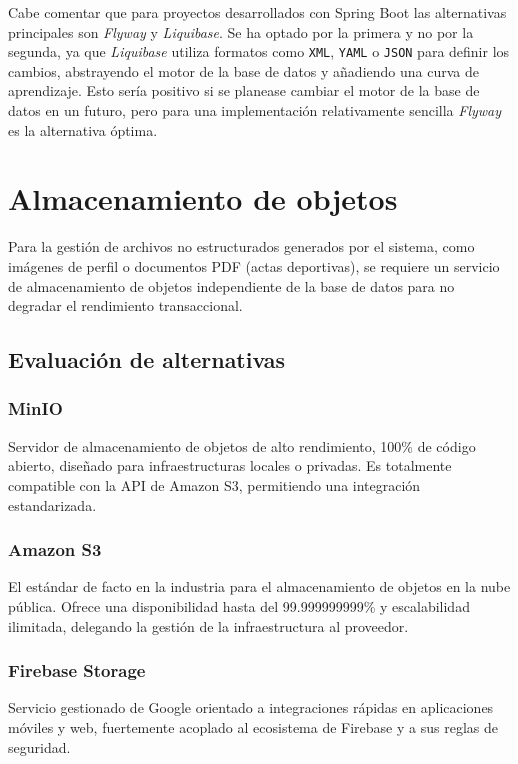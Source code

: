 Cabe comentar que para proyectos desarrollados con Spring Boot las alternativas principales son \emph{Flyway} y \emph{Liquibase}. Se ha optado por la primera y no por la segunda, ya que \emph{Liquibase} utiliza formatos como \texttt{XML}, \texttt{YAML} o \texttt{JSON} para definir los cambios, abstrayendo el motor de la base de datos y añadiendo una curva de aprendizaje. Esto sería positivo si se planease cambiar el motor de la base de datos en un futuro, pero para una implementación relativamente sencilla \emph{Flyway} es la alternativa óptima.

\section{Almacenamiento de objetos}

Para la gestión de archivos no estructurados generados por el sistema, como imágenes de perfil o documentos PDF (actas deportivas), se requiere un servicio de almacenamiento de objetos independiente de la base de datos para no degradar el rendimiento transaccional.

\subsection*{Evaluación de alternativas}

\subsubsection*{MinIO}
Servidor de almacenamiento de objetos de alto rendimiento, 100\% de código abierto, diseñado para infraestructuras locales o privadas. Es totalmente compatible con la API de Amazon S3, permitiendo una integración estandarizada.

\subsubsection*{Amazon S3}
El estándar de facto en la industria para el almacenamiento de objetos en la nube pública. Ofrece una disponibilidad hasta del 99.999999999\% y escalabilidad ilimitada, delegando la gestión de la infraestructura al proveedor.

\subsubsection*{Firebase Storage}
Servicio gestionado de Google orientado a integraciones rápidas en aplicaciones móviles y web, fuertemente acoplado al ecosistema de Firebase y a sus reglas de seguridad.

